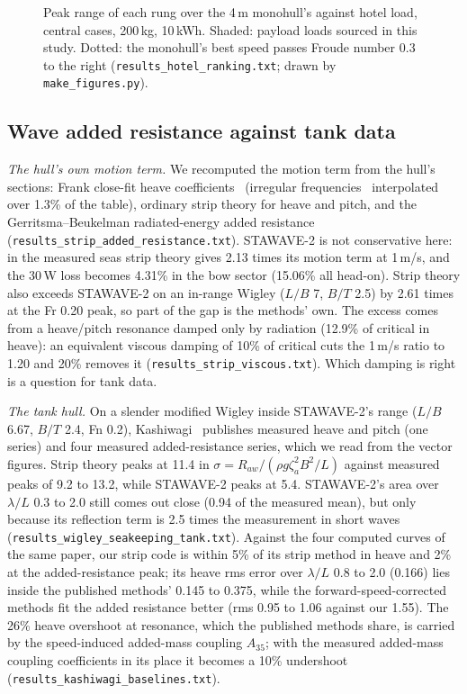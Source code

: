 \documentclass[conference]{IEEEtran}
\begin{document}
\begin{figure}[t]
\centering
\resizebox{\columnwidth}{!}{}
\caption{Peak range of each rung over the 4\,m monohull's against hotel load, central cases, 200\,kg,
10\,kWh. Shaded: payload loads sourced in this study. Dotted: the monohull's best speed passes
Froude number 0.3 to the right (\texttt{results\_hotel\_ranking.txt}; drawn by \texttt{make\_figures.py}).}
\label{fig:hotelrank}
\end{figure}

\subsection{Wave added resistance against tank data}\label{sec:waves}
\emph{The hull's own motion term.} We recomputed the motion term from the hull's sections: Frank close-fit heave coefficients~\cite{frank1967oscillation} (irregular frequencies~\cite{john1950floating} interpolated over 1.3\% of the table), ordinary strip theory for heave and pitch, and the Gerritsma--Beukelman radiated-energy added resistance~\cite{gerritsma1972added} (\texttt{results\_strip\_added\_resistance.txt}). STAWAVE-2 is not conservative here: in the measured seas strip theory gives 2.13 times its motion term at 1\,m/s, and the 30\,W loss becomes 4.31\% in the bow sector (15.06\% all head-on). Strip theory also exceeds STAWAVE-2 on an in-range Wigley ($L/B$ 7, $B/T$ 2.5) by 2.61 times at the Fr 0.20 peak, so part of the gap is the methods' own. The excess comes from a heave/pitch resonance damped only by radiation (12.9\% of critical in heave): an equivalent viscous damping of 10\% of critical cuts the 1\,m/s ratio to 1.20 and 20\% removes it (\texttt{results\_strip\_viscous.txt}). Which damping is right is a question for tank data.

\emph{The tank hull.} On a slender modified Wigley inside STAWAVE-2's range ($L/B$ 6.67, $B/T$ 2.4, Fn 0.2), Kashiwagi~\cite{kashiwagi2022enhanced} publishes measured heave and pitch (one series) and four measured added-resistance series, which we read from the vector figures. Strip theory peaks at 11.4 in $\sigma = R_{aw}/(\rho g \zeta_a^2 B^2/L)$ against measured peaks of 9.2 to 13.2, while STAWAVE-2 peaks at 5.4. STAWAVE-2's area over $\lambda/L$ 0.3 to 2.0 still comes out close (0.94 of the measured mean), but only because its reflection term is 2.5 times the measurement in short waves (\texttt{results\_wigley\_seakeeping\_tank.txt}). Against the four computed curves of the same paper, our strip code is within 5\% of its strip method in heave and 2\% at the added-resistance peak; its heave rms error over $\lambda/L$ 0.8 to 2.0 (0.166) lies inside the published methods' 0.145 to 0.375, while the forward-speed-corrected methods fit the added resistance better (rms 0.95 to 1.06 against our 1.55). The 26\% heave overshoot at resonance, which the published methods share, is carried by the speed-induced added-mass coupling $A_{35}$; with the measured added-mass coupling coefficients in its place it becomes a 10\% undershoot (\texttt{results\_kashiwagi\_baselines.txt}).
\end{document}
